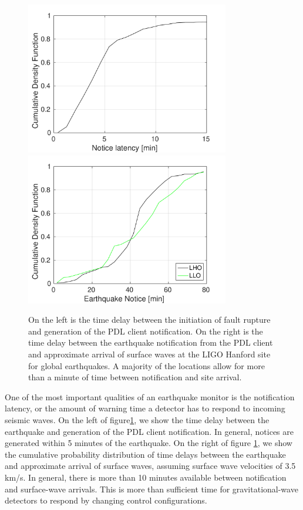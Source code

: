 \documentclass[reprint, prl, aps, showpacs]{revtex4-1}
\begin{document}
\begin{figure}[t]
\hspace*{-0.5cm}
 \includegraphics[width=3.5in]{earthquake_notice.pdf}
 \includegraphics[width=3.5in]{lockloss_notice.pdf}
 \caption{On the left is the time delay between the initiation of fault rupture and generation of the PDL client notification. On the right is the time delay between the earthquake notification from the PDL client and approximate arrival of surface waves at the LIGO Hanford site for global earthquakes. A majority of the locations allow for more than a minute of time between notification and site arrival.}
 \label{fig:delays}
\end{figure}

One of the most important qualities of an earthquake monitor is the notification latency, or the amount of warning time a detector has to respond to incoming seismic waves. On the left of figure\ref{fig:delays}, we show the time delay between the earthquake and generation of the PDL client notification. In general, notices are generated within 5 minutes of the earthquake. On the right of figure \ref{fig:delays}, we show the cumulative probability distribution of time delays between the earthquake and approximate arrival of surface waves, assuming surface wave velocities of 3.5\,km/s. In general, there is more than 10 minutes available between notification and surface-wave arrivals. This is more than sufficient time for gravitational-wave detectors to respond by changing control configurations.
\end{document}
